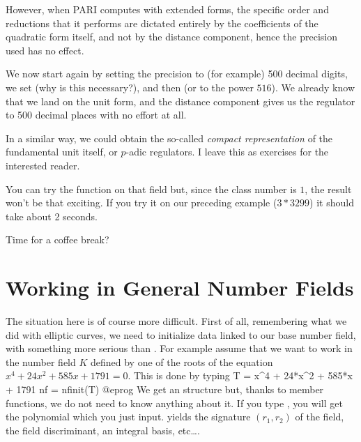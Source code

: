 However, when PARI computes with extended forms, the specific order and
reductions that it performs are dictated entirely by the coefficients of the
quadratic form itself, and not by the distance component, hence the precision
used has no effect.

We now start again by setting the precision to (for example) 500 decimal
digits, we set  (why is this necessary?), and then
 (or to the power $516$). We already know that we
land on the unit form, and the distance component gives us the regulator to
500 decimal places with no effort at all.

In a similar way, we could obtain the so-called \emph{compact representation}
of the fundamental unit itself, or $p$-adic regulators. I leave this as
exercises for the interested reader.

You can try the  function on that field but, since the class
number is $1$, the result won't be that exciting. If you try it on our
preceding example ($3*3299$) it should take about 2 seconds.
\medskip

Time for a coffee break?

\section{Working in General Number Fields}

The situation here is of course more difficult. First of all, remembering
what we did with elliptic curves, we need to initialize data linked to our
base number field, with something more serious than . For
example assume that we want to work in the number field $K$ defined by one of
the roots of the equation $x^4+24x^2+585x+1791=0$. This is done by typing
\bprog
  T = x^4 + 24*x^2 + 585*x + 1791
  nf = nfinit(T)
@eprog\noindent
We get an  structure but, thanks to member functions, we do not need
to know anything about it. If you type , you will get the
polynomial  which you just input.  yields the signature
$(r_1,r_2)$ of the field,  the field discriminant, 
an integral basis, etc\dots.

